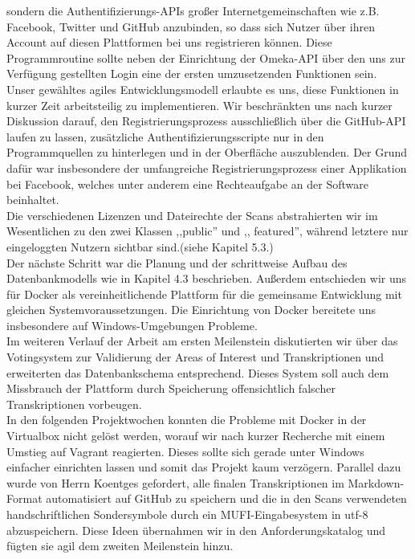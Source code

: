 \documentclass{article}
\begin{document}
sondern die Authentifizierungs-APIs großer Internetgemeinschaften wie z.B. Facebook, Twitter und GitHub anzubinden, so dass sich Nutzer über ihren Account auf diesen Plattformen bei uns registrieren können.
Diese Programmroutine sollte neben der Einrichtung der Omeka-API über den uns zur Verfügung gestellten Login eine der ersten umzusetzenden Funktionen sein.\\
Unser gewähltes agiles Entwicklungsmodell erlaubte es uns, diese Funktionen in kurzer Zeit arbeitsteilig zu implementieren.
Wir beschränkten uns nach kurzer Diskussion darauf, den Registrierungsprozess ausschließlich über die GitHub-API laufen zu lassen, zusätzliche Authentifizierungsscripte nur in den Programmquellen zu hinterlegen und in der Oberfläche auszublenden. 
Der Grund dafür war insbesondere der umfangreiche Registrierungsprozess einer Applikation bei Facebook, welches unter anderem eine Rechteaufgabe an der Software beinhaltet.\\
Die verschiedenen Lizenzen und Dateirechte der Scans abstrahierten wir im Wesentlichen zu den zwei Klassen ,,public'' und ,, featured'', während letztere nur eingeloggten Nutzern sichtbar sind.(siehe Kapitel 5.3.)\\
Der nächste Schritt war die Planung und der schrittweise Aufbau des Datenbankmodells wie in Kapitel 4.3 beschrieben. 
Außerdem entschieden wir uns für Docker als vereinheitlichende Plattform für die gemeinsame Entwicklung mit gleichen Systemvoraussetzungen.
Die Einrichtung von Docker bereitete uns insbesondere auf Windows-Umgebungen Probleme.\\
Im weiteren Verlauf der Arbeit am ersten Meilenstein diskutierten wir über das Votingsystem zur Validierung der Areas of Interest und Transkriptionen und 
erweiterten das Datenbankschema entsprechend. 
Dieses System soll auch dem Missbrauch der Plattform durch Speicherung offensichtlich falscher Transkriptionen vorbeugen.\\
In den folgenden Projektwochen konnten die Probleme mit Docker in der Virtualbox nicht gelöst werden, worauf wir nach kurzer Recherche mit einem Umstieg auf Vagrant reagierten.
Dieses sollte sich gerade unter Windows einfacher einrichten lassen und somit das Projekt kaum verzögern.
Parallel dazu wurde von Herrn Koentges gefordert, alle finalen Transkriptionen im Markdown-Format automatisiert auf GitHub zu speichern und
die in den Scans verwendeten handschriftlichen Sondersymbole durch ein MUFI-Eingabesystem in utf-8 abzuspeichern.
Diese Ideen übernahmen wir in den Anforderungskatalog und fügten sie agil dem zweiten Meilenstein hinzu.\\
\end{document}
